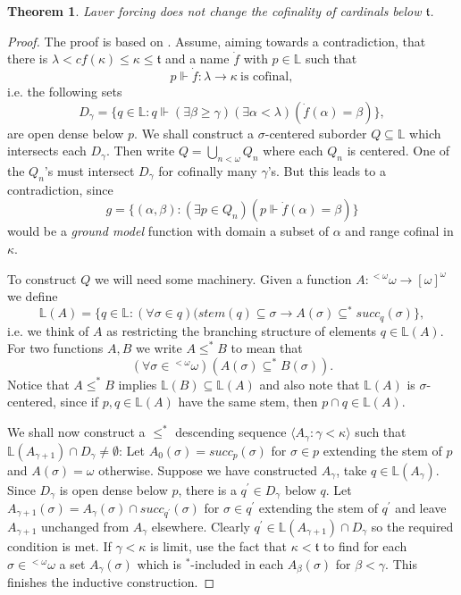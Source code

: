 \documentclass[a4paper,11pt,oneside]{mybook}
\def\cont{{2^{\aleph_0}}}
\def\force{\Vdash}
\theoremstyle{theorem}
\newtheorem{theorem}[subsection]{Theorem}
\theoremstyle{example}
\begin{document}

\begin{theorem} Laver forcing does not change the cofinality of cardinals below $\mathfrak{t}$.
\end{theorem}


\begin{proof} The proof is based on \cite{towers-on-trees}. Assume, aiming towards a contradiction, that there is $\lambda<cf(\kappa)\leq\kappa\leq\mathfrak{t}$ and a
 name $\dot{f}$ with $p\in\mathbb{L}$ such that
 $$
 p\force \dot{f}:\lambda\to\kappa\ \mbox{is cofinal},
 $$
 i.e. the following sets
 $$
   D_\gamma =\{q\in \mathbb{L}:q\force (\exists \beta\geq\gamma)(\exists\alpha<\lambda)(\dot{f}(\alpha)=\beta)\},
 $$
 are open dense below $p$. We shall construct a $\sigma$-centered suborder $Q\subseteq\mathbb{L}$ which intersects each $D_\gamma$.
 Then write $Q=\bigcup_{n<\omega}Q_n$ where each $Q_n$ is centered. One of the $Q_n$'s must intersect $D_\gamma$ for cofinally many
 $\gamma$'s. But this leads to a contradiction, since
 $$
 g=\{(\alpha,\beta):(\exists p\in Q_n)(p\force \dot{f}(\alpha)=\beta)\}
 $$
 would be a \emph{ground model} function with domain a subset of $\alpha$ and range cofinal in $\kappa$.

 To construct $Q$ we will need some machinery. Given a function $A:{}^{<\omega}\omega\to[\omega]^\omega$ we define
 $$
 \mathbb{L}(A)=\{q\in\mathbb{L}:(\forall\sigma\in q)(stem(q)\subseteq\sigma\rightarrow A(\sigma)\subseteq^* succ_q(\sigma)\},
 $$
 i.e. we think of $A$ as restricting the branching structure of elements $q\in\mathbb{L}(A)$. For two functions $A,B$ we
 write $A\leq^* B$ to mean that
 $$(\forall\sigma\in{}^{<\omega}{\omega})(A(\sigma)\subseteq^* B(\sigma)).$$
 Notice that $A\leq^*B$ implies $\mathbb{L}(B)\subseteq \mathbb{L}(A)$ and also note that $\mathbb{L}(A)$ is $\sigma$-centered, since if $p,q\in \mathbb{L}(A)$ have the
 same stem, then $p\cap q\in \mathbb{L}(A)$.

 We shall now construct a $\leq^*$ descending sequence $\langle A_\gamma:\gamma<\kappa\rangle$ such that $\mathbb{L}(A_{\gamma+1})\cap D_\gamma\neq\emptyset$:
 Let $A_0(\sigma)=succ_p(\sigma)$ for $\sigma\in p$ extending the stem of $p$ and $A(\sigma)=\omega$ otherwise.
 Suppose we have constructed $A_\gamma$, take $q\in \mathbb{L}(A_\gamma)$. Since $D_\gamma$ is open dense below $p$, there is a $q^\prime\in D_\gamma$ below $q$.
 Let $A_{\gamma+1}(\sigma)=A_\gamma(\sigma)\cap succ_{q^\prime}(\sigma)$ for $\sigma\in q^\prime$ extending the stem of $q^\prime$ and leave $A_{\gamma+1}$
 unchanged from $A_\gamma$ elsewhere. Clearly $q^\prime\in \mathbb{L}(A_{\gamma+1})\cap D_\gamma$ so the required condition is met. If $\gamma<\kappa$ is limit,
 use the fact that $\kappa<\mathfrak{t}$ to find for each $\sigma\in{}^{<\omega}\omega$ a set $A_\gamma(\sigma)$ which is ${}^*$-included in each
 $A_\beta(\sigma)$ for $\beta<\gamma$. This finishes the inductive construction.


\end{proof}
\end{document}
